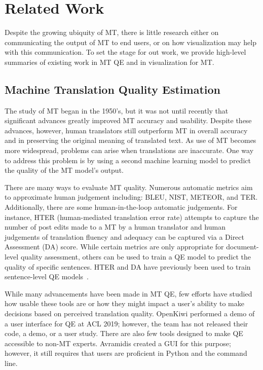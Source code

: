\section{Related Work}

Despite the growing ubiquity of MT, there is little research either on communicating the output of MT to end users, or on how visualization may help with this communication.  
To set the stage for out work, we provide high-level summaries of existing work in MT QE and in visualization for MT.  

\subsection{Machine Translation Quality Estimation} 
The study of MT began in the 1950's, but it was not until recently that significant advances greatly improved MT accuracy and usability. Despite these advances, however, human translators still outperform MT in overall accuracy and in preserving the original meaning of translated text\cite{mauvcec2019machine}. As use of MT becomes more widespread, problems can arise when translations are inaccurate. One way to address this problem is by using a second machine learning model to predict the quality of the MT model's output.  

There are many ways to evaluate MT quality. Numerous automatic metrics aim to approximate human judgement including: BLEU, NIST, METEOR, and TER\cite{mauvcec2019machine}. Additionally, there are some human-in-the-loop automatic judgements. For instance, HTER (human-mediated translation error rate)  attempts to capture the number of post edits made to a MT by a human translator\cite{mauvcec2019machine} and human judgements of translation fluency and adequacy\cite{snover2009Fluency} can be captured via a Direct Assessment (DA) score. While certain metrics are only appropriate for document-level quality assessment, others can be used to train a QE model to predict the quality of specific sentences. HTER and DA have previously been used to train sentence-level QE models~\cite{turchi2014adaptive, graham_baldwin_moffat_zobel_2017}.            

While many advancements have been made in MT QE, few efforts have studied how usable these tools are or how they might impact a user's ability to make decisions based on perceived translation quality. OpenKiwi \cite{UnBabel} performed a demo of a user interface for QE at ACL 2019; however, the team has not released their code, a demo, or a user study. There are also few tools designed to make QE accessible to non-MT experts. Avramidis created a GUI for this purpose; however, it still requires that users are proficient in Python and the command line\cite{avramidis2017QE}.    

